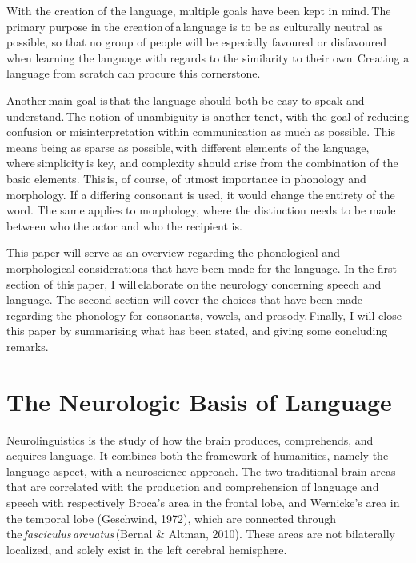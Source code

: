 With the creation of the language, multiple goals have been kept in mind. The primary purpose in the creation of a language is to be as culturally neutral as possible, so that no group of people will be especially favoured or disfavoured when learning the language with regards to the similarity to their own. Creating a language from scratch can procure this cornerstone. 

Another main goal is that the language should both be easy to speak and understand. The notion of unambiguity is another tenet, with the goal of reducing confusion or misinterpretation within communication as much as possible. This means being as sparse as possible, with different elements of the language, where simplicity is key, and complexity should arise from the combination of the basic elements. This is, of course, of utmost importance in phonology and morphology. If a differing consonant is used, it would change the entirety of the word. The same applies to morphology, where the distinction needs to be made between who the actor and who the recipient is. 

This paper will serve as an overview regarding the phonological and morphological considerations that have been made for the language. In the first section of this paper, I will elaborate on the neurology concerning speech and language. The second section will cover the choices that have been made regarding the phonology for consonants, vowels, and prosody. Finally, I will close this paper by summarising what has been stated, and giving some concluding remarks.



\section{The Neurologic Basis of Language}
Neurolinguistics is the study of how the brain produces, comprehends, and acquires language. 
It combines both the framework of humanities, namely the language aspect, with a neuroscience approach. The two traditional brain areas that are correlated with the production and comprehension of language and speech with respectively Broca’s area in the frontal lobe, and Wernicke’s area in the temporal lobe (Geschwind, 1972), which are connected through the \textit{fasciculus arcuatus} (Bernal & Altman, 2010). These areas are not bilaterally localized, and solely exist in the left cerebral hemisphere. 

